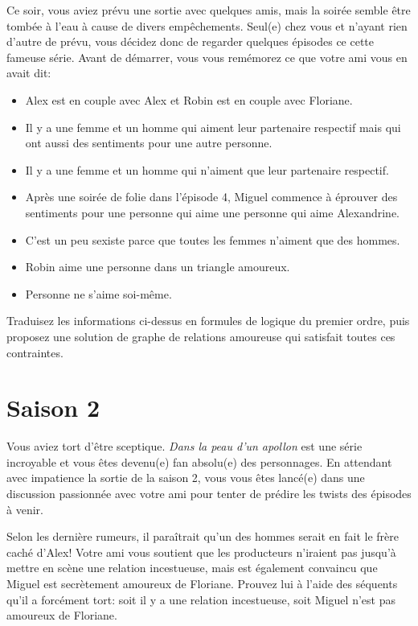 \documentclass[a4paper, titlepage]{article}
\numberwithin{figure}{section}
\numberwithin{table}{section}
\begin{document}
Ce soir, vous aviez prévu une sortie avec quelques amis,
mais la soirée semble être tombée à l’eau à cause de divers empêchements.
Seul(e) chez vous et n’ayant rien d’autre de prévu,
vous décidez donc de regarder quelques épisodes ce cette fameuse série.
Avant de démarrer, vous vous remémorez ce que votre ami vous en avait dit:

\begin{itemize}
  \item Alex est en couple avec Alex et Robin est en couple avec Floriane.
  \item Il y a une femme et un homme qui aiment leur partenaire respectif mais qui ont aussi des sentiments pour une autre personne.
  \item Il y a une femme et un homme qui n’aiment que leur partenaire respectif.
  \item Après une soirée de folie dans l’épisode 4, Miguel commence à éprouver des sentiments pour une personne qui aime une personne qui aime Alexandrine.
  \item C’est un peu sexiste parce que toutes les femmes n’aiment que des hommes.
  \item Robin aime une personne dans un triangle amoureux.
  \item Personne ne s'aime soi-même.
\end{itemize}

Traduisez les informations ci-dessus en formules de logique du premier ordre,
puis proposez une solution de graphe de relations amoureuse qui satisfait toutes ces contraintes.

\section{Saison 2}

Vous aviez tort d’être sceptique.
\emph{Dans la peau d’un apollon} est une série incroyable
et vous êtes devenu(e) fan absolu(e) des personnages.
En attendant avec impatience la sortie de la saison 2,
vous vous êtes lancé(e) dans une discussion passionnée avec votre ami
pour tenter de prédire les twists des épisodes à venir.

Selon les dernière rumeurs, il paraîtrait qu’un des hommes serait en fait le frère caché d’Alex!
Votre ami vous soutient que les producteurs n’iraient pas jusqu’à mettre en scène une relation incestueuse,
mais est également convaincu que Miguel est secrètement amoureux de Floriane.
Prouvez lui à l’aide des séquents qu’il a forcément tort:
soit il y a une relation incestueuse, soit Miguel n’est pas amoureux de Floriane.
\end{document}
